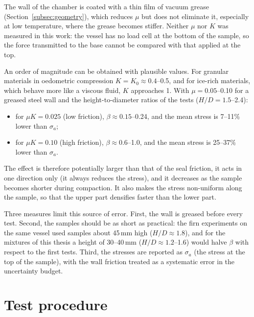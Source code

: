 The wall of the chamber is coated with a thin film of vacuum grease (Section~\ref{subsec:geometry}), which reduces $\mu$ but does not eliminate it, especially at low temperature, where the grease becomes stiffer. Neither $\mu$ nor $K$ was measured in this work: the vessel has no load cell at the bottom of the sample, so the force transmitted to the base cannot be compared with that applied at the top.

An order of magnitude can be obtained with plausible values. For granular materials in oedometric compression $K = K_0\approx0.4$--0.5, and for ice-rich materials, which behave more like a viscous fluid, $K$ approaches 1. With $\mu = 0.05$--0.10 for a greased steel wall and the height-to-diameter ratios of the tests ($H/D = 1.5$--2.4):
\begin{itemize}
    \item for $\mu K = 0.025$ (low friction), $\beta\approx0.15$--0.24, and the mean stress is 7--11\% lower than $\sigma_a$;
    \item for $\mu K = 0.10$ (high friction), $\beta\approx0.6$--1.0, and the mean stress is 25--37\% lower than $\sigma_a$.
\end{itemize}
The effect is therefore potentially larger than that of the seal friction, it acts in one direction only (it always reduces the stress), and it decreases as the sample becomes shorter during compaction. It also makes the stress non-uniform along the sample, so that the upper part densifies faster than the lower part.

Three measures limit this source of error. First, the wall is greased before every test. Second, the samples should be as short as practical: the firn experiments on the same vessel used samples about 45\,mm high ($H/D\approx1.8$), and for the mixtures of this thesis a height of 30--40\,mm ($H/D\approx1.2$--1.6) would halve $\beta$ with respect to the first tests. Third, the stresses are reported as $\sigma_a$ (the stress at the top of the sample), with the wall friction treated as a systematic error in the uncertainty budget.

\section{Test procedure}
\label{sec:procedure}

